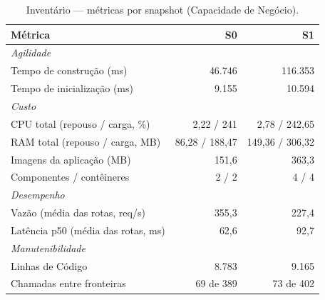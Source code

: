 \begin{table}[htb]
  \centering
  \caption{Inventário — métricas por snapshot (Capacidade de Negócio).}
  \label{tab:comp_inventory-api_capacidade-negocio_snapshots}
  \begin{tabular}{lrr}
    \hline
    \textbf{Métrica} & \textbf{S0} & \textbf{S1} \\
    \hline
    \multicolumn{3}{l}{\textit{Agilidade}} \\
    Tempo de construção (ms) & 46.746 & 116.353 \\
    Tempo de inicialização (ms) & 9.155 & 10.594 \\
    \multicolumn{3}{l}{\textit{Custo}} \\
    CPU total (repouso / carga, \%) & 2,22 / 241 & 2,78 / 242,65 \\
    RAM total (repouso / carga, MB) & 86,28 / 188,47 & 149,36 / 306,32 \\
    Imagens da aplicação (MB) & 151,6 & 363,3 \\
    Componentes / contêineres & 2 / 2 & 4 / 4 \\
    \multicolumn{3}{l}{\textit{Desempenho}} \\
    Vazão (média das rotas, req/s) & 355,3 & 227,4 \\
    Latência p50 (média das rotas, ms) & 62,6 & 92,7 \\
    \multicolumn{3}{l}{\textit{Manutenibilidade}} \\
    Linhas de Código & 8.783 & 9.165 \\
    Chamadas entre fronteiras & 69 de 389 & 73 de 402 \\
    \hline
  \end{tabular}
\end{table}
